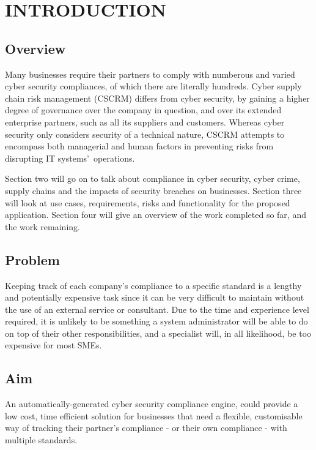 \chapter{INTRODUCTION}
    \section{Overview}
        Many businesses require their partners to comply with numberous and varied cyber security compliances, of which there are literally hundreds. Cyber supply chain risk management (CSCRM) differs from cyber security, by gaining a higher degree of governance over the company in question, and over its extended enterprise partners, such as all its suppliers and customers. Whereas cyber security only considers security of a technical nature, CSCRM attempts to encompass both managerial and human factors in preventing risks from disrupting IT systems\textquoteright\ operations. \cite{CSCRM}

        Section two will go on to talk about compliance in cyber security, cyber crime, supply chains and the impacts of security breaches on businesses. Section three will look at use cases, requirements, risks and functionality for the proposed application. Section four will give an overview of the work completed so far, and the work remaining.

    \section{Problem}
        Keeping track of each company\textquoteright s compliance to a specific standard is a lengthy and potentially expensive task since it can be very difficult to maintain without the use of an external service or consultant. Due to the time and experience level required, it is unlikely to be something a system administrator will be able to do on top of their other responsibilities, and a specialist will, in all likelihood, be too expensive for most SMEs.

    \section{Aim}
        An automatically-generated cyber security compliance engine, could provide a low cost, time efficient solution for businesses that need a flexible, customisable way of tracking their partner\textquoteright s compliance - or their own compliance - with multiple standards.

